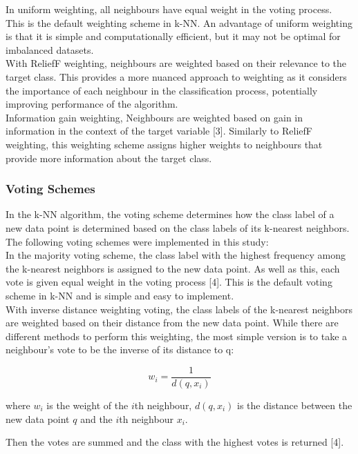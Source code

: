 In uniform weighting, all neighbours have equal weight in the voting process.
This is the default weighting scheme in k-NN.
An advantage of uniform weighting is that it is simple and computationally efficient, but it may not be optimal for imbalanced datasets.\\

With ReliefF weighting, neighbours are weighted based on their relevance to the target class.
This provides a more nuanced approach to weighting as it considers the importance of each neighbour in the classification process, potentially
improving performance of the algorithm.\\

Information gain weighting, Neighbours are weighted based on gain in information in the context of the target variable [3].
Similarly to ReliefF weighting, this weighting scheme assigns higher weights to neighbours that provide more information about the target class.\\

\subsubsection*{Voting Schemes}
In the k-NN algorithm, the voting scheme determines how the class label of a new data point is determined based on the class labels of its k-nearest neighbors.
The following voting schemes were implemented in this study:\\

In the majority voting scheme, the class label with the highest frequency among the k-nearest neighbors is assigned to the new data point.
As well as this, each vote is given equal weight in the voting process [4].
This is the default voting scheme in k-NN and is simple and easy to implement.\\

With inverse distance weighting voting, the class labels of the k-nearest neighbors are weighted based on their distance from the new data point.
While there are different methods to perform this weighting, the most simple version is to take a neighbour's vote to be the inverse
of its distance to q:

\[ w_i = \frac{1}{d(q, x_i)} \]

where \(w_i\) is the weight of the \(i\)th neighbour, \(d(q, x_i)\) is the distance between the new data point \(q\) and the \(i\)th neighbour \(x_i\).

Then the votes are summed and the class with the highest votes is returned [4].\\


